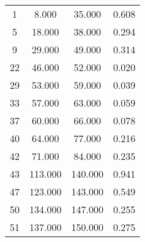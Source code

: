 % 
\begin{tabular}{cccc}
  \hline
  \hline
1 & 8.000 & 35.000 & 0.608 \\ 
  5 & 18.000 & 38.000 & 0.294 \\ 
  9 & 29.000 & 49.000 & 0.314 \\ 
  22 & 46.000 & 52.000 & 0.020 \\ 
  29 & 53.000 & 59.000 & 0.039 \\ 
  33 & 57.000 & 63.000 & 0.059 \\ 
  37 & 60.000 & 66.000 & 0.078 \\ 
  40 & 64.000 & 77.000 & 0.216 \\ 
  42 & 71.000 & 84.000 & 0.235 \\ 
  43 & 113.000 & 140.000 & 0.941 \\ 
  47 & 123.000 & 143.000 & 0.549 \\ 
  50 & 134.000 & 147.000 & 0.255 \\ 
  51 & 137.000 & 150.000 & 0.275 \\ 
   \hline
\end{tabular}
